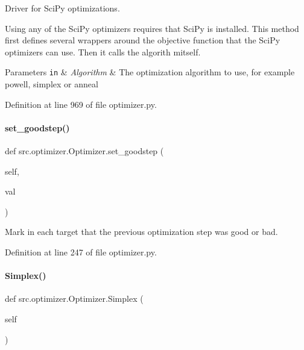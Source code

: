 Driver for Sci\+Py optimizations. 

Using any of the Sci\+Py optimizers requires that Sci\+Py is installed. This method first defines several wrappers around the objective function that the Sci\+Py optimizers can use. Then it calls the algorith mitself.


\begin{DoxyParams}[1]{Parameters}
\mbox{\tt in}  & {\em Algorithm} & The optimization algorithm to use, for example \textquotesingle{}powell\textquotesingle{}, \textquotesingle{}simplex\textquotesingle{} or \textquotesingle{}anneal\textquotesingle{} \\
\hline
\end{DoxyParams}


Definition at line 969 of file optimizer.\+py.

\mbox{\label{classsrc_1_1optimizer_1_1Optimizer_abb29ac2f8b4bd4fca545eb3f6b0470fe}} 
\paragraph{\texorpdfstring{set\+\_\+goodstep()}{set\_goodstep()}}
{\footnotesize\ttfamily def src.\+optimizer.\+Optimizer.\+set\+\_\+goodstep (\begin{DoxyParamCaption}\item[{}]{self,  }\item[{}]{val }\end{DoxyParamCaption})}



Mark in each target that the previous optimization step was good or bad. 



Definition at line 247 of file optimizer.\+py.

\mbox{\label{classsrc_1_1optimizer_1_1Optimizer_a1265cbe1250d67e385e9ed5ca9c946ea}} 
\paragraph{\texorpdfstring{Simplex()}{Simplex()}}
{\footnotesize\ttfamily def src.\+optimizer.\+Optimizer.\+Simplex (\begin{DoxyParamCaption}\item[{}]{self }\end{DoxyParamCaption})}



